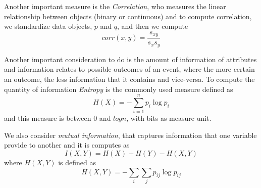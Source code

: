 Another important measure is the \emph{Correlation}, who measures the linear relationship between objects (binary or continuous) and to compute correlation,
we standardize data objects, $p$ and $q$, and then we compute
\[ corr(x, y) = \frac{s_{xy}}{s_x s_y} \]

Another important consideration to do is the amount of information of attributes and information relates to possible outcomes of an event, where 
the more certain an outcome, the less information that it contains and vice-versa.\newline
To compute the quantity of information \emph{Entropy} is the commonly used measure defined as 
\[ H(X) = - \sum _{i=1}^n p_i \log p_i \]
and this measure is between $0$ and $log n$, with bits as measure unit.

We also consider \emph{mutual information}, that captures information that one variable provide to another and it is computes as 
\[ I(X, Y) = H(X) + H(Y) - H(X, Y) \] 
where $H(X, Y)$ is defined as 
\[ H(X, Y) = - \sum _i \sum _j p_{ij} \log p_{ij} \]


